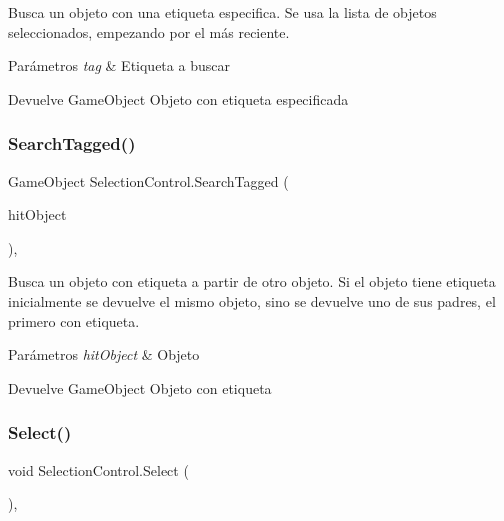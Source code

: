 Busca un objeto con una etiqueta especifica. Se usa la lista de objetos seleccionados, empezando por el más reciente. 
\begin{DoxyParams}{Parámetros}
{\em tag} & Etiqueta a buscar \\
\hline
\end{DoxyParams}
\begin{DoxyReturn}{Devuelve}
Game\+Object Objeto con etiqueta especificada 
\end{DoxyReturn}
\mbox{\label{class_selection_control_af43fca6b87eee0f60bc8bb79f987d42c}} 
\subsubsection{\texorpdfstring{SearchTagged()}{SearchTagged()}}
{\footnotesize\ttfamily Game\+Object Selection\+Control.\+Search\+Tagged (\begin{DoxyParamCaption}\item[{Game\+Object}]{hit\+Object }\end{DoxyParamCaption})\hspace{0.3cm}{\ttfamily [inline]}, {\ttfamily [private]}}

Busca un objeto con etiqueta a partir de otro objeto. Si el objeto tiene etiqueta inicialmente se devuelve el mismo objeto, sino se devuelve uno de sus padres, el primero con etiqueta. 
\begin{DoxyParams}{Parámetros}
{\em hit\+Object} & Objeto \\
\hline
\end{DoxyParams}
\begin{DoxyReturn}{Devuelve}
Game\+Object Objeto con etiqueta 
\end{DoxyReturn}
\mbox{\label{class_selection_control_a6e08e34b6c7bfe54260faeaa29b369c0}} 
\subsubsection{\texorpdfstring{Select()}{Select()}}
{\footnotesize\ttfamily void Selection\+Control.\+Select (\begin{DoxyParamCaption}{ }\end{DoxyParamCaption})\hspace{0.3cm}{\ttfamily [inline]}, {\ttfamily [private]}}

